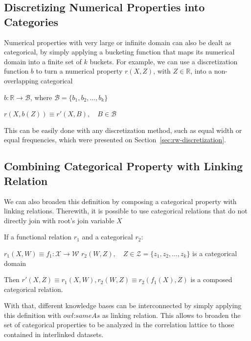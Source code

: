 \subsection{Discretizing Numerical Properties into Categories}

Numerical properties with very large or infinite domain can also be dealt as categorical, by simply applying a
bucketing
function that maps its numerical domain into a finite set of $k$ buckets. For example, we can use a discretization
function $b$ to turn a numerical property $r(X,Z)$, with $Z \in \mathbb{R}$, into a non-overlapping categorical

\begin{center}
 $b: \mathbb{R} \rightarrow \mathcal{B}$, where $\mathcal{B}=\{b_1,b_2,\dots ,b_k \}$
\end{center}

\begin{center}
 $r(X,b(Z)) \equiv r'(X,B) , \quad B \in \mathcal{B}$
\end{center}

This can be easily done with any discretization method, such as equal width or equal frequencies, which were
presented on Section~\ref{sec:rw-discretization}.

\subsection{Combining Categorical Property with Linking Relation}
We can also broaden this definition by composing a categorical property with linking relations. Therewith, it is
possible to use categorical relations that do not directly join with root's join variable $X$

If a functional relation $r_1$ and a categorical $r_2$:

$r_1(X,W) \equiv f_1 : \mathcal{X} \rightarrow \mathcal{W}$ \newline
$r_2(W,Z),\quad Z \in \mathcal{Z}=\{z_1,z_2,\ldots,z_k\}$ is a categorical domain 

Then $r'(X,Z) \equiv r_1(X,W),r_2(W,Z) \equiv r_2(f_1(X),Z)$ is a composed categorical relation. 

With that, different knowledge bases can be interconnected by simply applying this definition with $owl$:$sameAs$
as linking relation. This allows to broaden the set of categorical properties to be analyzed in the correlation
lattice
to those contained in interlinked datasets.

